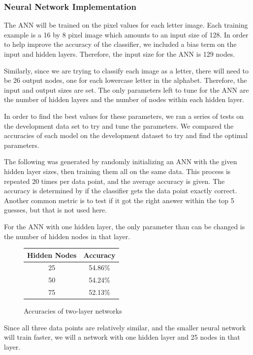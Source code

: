 \documentclass[11pt,a4paper,twocolumn]{article}
\begin{document}
\subsubsection*{Neural Network Implementation}

The ANN will be trained on the pixel values for each letter image. Each training example is a 16 by 8 pixel image which amounts to an input size of 128. In order to help improve the accuracy of the classifier, we included a bias term on the input and hidden layers. Therefore, the input size for the ANN is 129 nodes.

Similarly, since we are trying to classify each image as a letter, there will need to be 26 output nodes, one for each lowercase letter in the alphabet. Therefore, the input and output sizes are set. The only parameters left to tune for the ANN are the number of hidden layers and the number of nodes within each hidden layer.

In order to find the best values for these parameters, we ran a series of tests on the development data set to try and tune the parameters. We compared the accuracies of each model on the development dataset to try and find the optimal parameters.

The following was generated by randomly initializing an ANN with the given hidden layer sizes, then training them all on the same data. This process is repeated 20 times per data point, and the average accuracy is given. The accuracy is determined by if the classifier gets the data point exactly correct. Another common metric is to test if it got the right answer within the top 5 guesses, but that is not used here.

For the ANN with one hidden layer, the only parameter than can be changed is the number of hidden nodes in that layer.
\begin{figure}[h]
\caption{Accuracies of two-layer networks}
\centering
\begin{tabular}{|c|c|}
\hline 
Hidden Nodes & Accuracy \\ 
\hline 
25 & 54.86\% \\ 
\hline 
50 & 54.24\% \\ 
\hline 
75 & 52.13\% \\ 
\hline 
\end{tabular} 
\end{figure}

Since all three data points are relatively similar, and the smaller neural network will train faster, we will a network with one hidden layer and 25 nodes in that layer.
\end{document}
